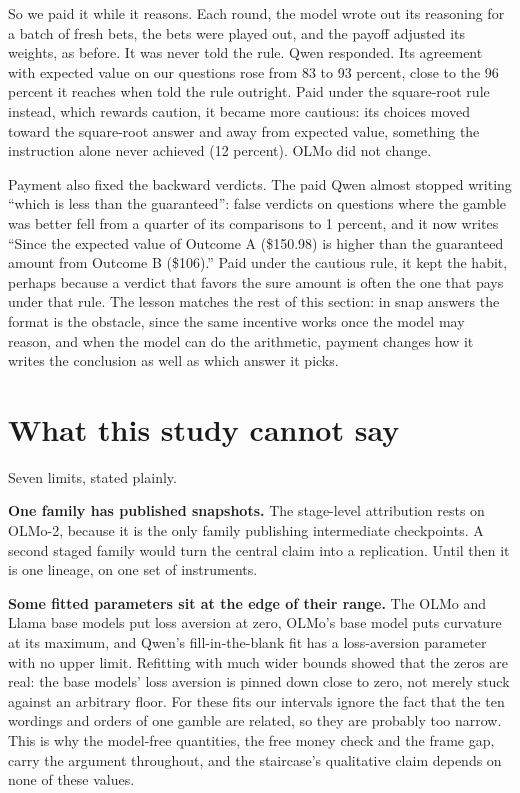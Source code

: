 \documentclass[11pt]{article}
\begin{document}
So we paid it while it reasons. Each round, the model wrote out its reasoning for a batch of fresh
bets, the bets were played out, and the payoff adjusted its weights, as before. It was never told the
rule. Qwen responded. Its agreement with expected value on our questions rose from 83 to 93 percent,
close to the 96 percent it reaches when told the rule outright. Paid under the square-root rule
instead, which rewards caution, it became more cautious: its choices moved toward the square-root
answer and away from expected value, something the instruction alone never achieved (12 percent).
OLMo did not change.

Payment also fixed the backward verdicts. The paid Qwen almost stopped writing ``which is less than
the guaranteed'': false verdicts on questions where the gamble was better fell from a quarter of its
comparisons to 1 percent, and it now writes ``Since the expected value of Outcome A (\$150.98) is higher
than the guaranteed amount from Outcome B (\$106).'' Paid under the cautious rule, it kept the habit,
perhaps because a verdict that favors the sure amount is often the one that pays under that rule. The
lesson matches the rest of this section: in snap answers the format is the obstacle, since the same
incentive works once the model may reason, and when the model can do the arithmetic, payment changes how it writes the conclusion as well as which
answer it picks.

\section{What this study cannot say}

Seven limits, stated plainly.

\textbf{One family has published snapshots.} The stage-level attribution rests on OLMo-2, because
it is the only family publishing intermediate checkpoints. A second staged family would turn the
central claim into a replication. Until then it is one lineage, on one set of instruments.

\textbf{Some fitted parameters sit at the edge of their range.} The OLMo and Llama base models
put loss aversion at zero, OLMo's base model puts curvature at its maximum, and Qwen's
fill-in-the-blank fit has a loss-aversion parameter with no upper limit. Refitting with much
wider bounds showed that the zeros are real: the base models' loss aversion is pinned down close
to zero, not merely stuck against an arbitrary floor. For these fits our intervals ignore the
fact that the ten wordings and orders of one gamble are related, so they are probably too narrow.
This is why the model-free quantities, the free money check and the frame gap, carry the argument
throughout, and the staircase's qualitative claim depends on none of these values.
\end{document}
